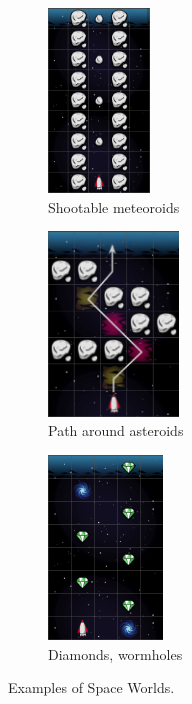 \begin{figure}[htb]
\centering
\begin{subfigure}[t]{0.31\textwidth}
\centering
\includegraphics[height=49mm]{img/spaceworld-meteoroids}
\caption{Shootable meteoroids}
\label{fig:spaceworld-meteoroids}
\end{subfigure}
\begin{subfigure}[t]{0.35\textwidth}
\centering
\includegraphics[height=49mm]{img/spaceworld-path}
\caption{Path around asteroids}
\label{fig:spaceworld-path}
\end{subfigure}%
\begin{subfigure}[t]{0.33\textwidth}
\centering
\includegraphics[height=49mm]{img/spaceworld-wormholes}
\caption{Diamonds, wormholes}
\label{fig:spaceworld-wormholes}
\end{subfigure}
\caption{Examples of Space Worlds.}
\label{fig:spaceworld}
\end{figure}




